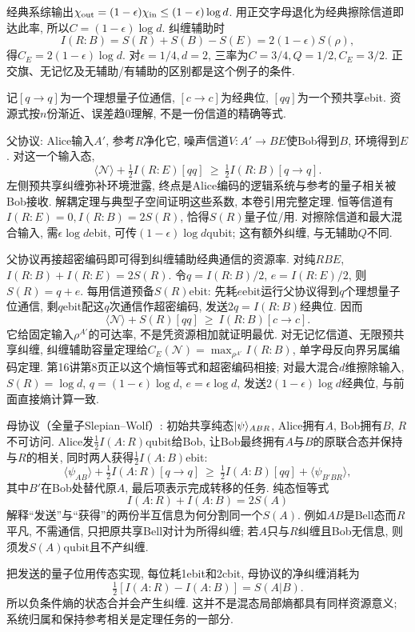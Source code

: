 经典系综输出$\chi_{\rm out}=(1-\epsilon)\chi_{\rm in}\le(1-\epsilon)\log d$. 用正交字母退化为经典擦除信道即达此率, 所以$C=(1-\epsilon)\log d$. 纠缠辅助时
\[I(R:B)=S(R)+S(B)-S(E)=2(1-\epsilon)S(\rho),\]
得$C_E=2(1-\epsilon)\log d$. 对$\epsilon=1/4,d=2$, 三率为$C=3/4,Q=1/2,C_E=3/2$. 正交旗、无记忆及无辅助/有辅助的区别都是这个例子的条件.

记$[q\to q]$为一个理想量子位通信, $[c\to c]$为经典位, $[qq]$为一个预共享ebit. 资源式按$n$份渐近、误差趋0理解, 不是一份信道的精确等式.

父协议: Alice输入$A'$, 参考$R$净化它, 噪声信道$V:A'\to BE$使Bob得到$B$, 环境得到$E$. 对这一个输入态,
\[\langle\mathcal N\rangle+\tfrac12I(R:E)[qq]
 \ \ge\ \tfrac12I(R:B)[q\to q].\]
左侧预共享纠缠弥补环境泄露, 终点是Alice编码的逻辑系统与参考的量子相关被Bob接收. 解耦定理与典型子空间证明这些系数, 本卷引用完整定理. 恒等信道有$I(R:E)=0,I(R:B)=2S(R)$, 恰得$S(R)$量子位/用. 对擦除信道和最大混合输入, 需$\epsilon\log d$ebit, 可传$(1-\epsilon)\log d$qubit; 这有额外纠缠, 与无辅助$Q$不同.

父协议再接超密编码即可得到纠缠辅助经典通信的资源率. 对纯$RBE$, $I(R:B)+I(R:E)=2S(R)$. 令$q=I(R:B)/2$, $e=I(R:E)/2$, 则$S(R)=q+e$. 每用信道预备$S(R)$ebit: 先耗$e$ebit运行父协议得到$q$个理想量子位通信, 剩$q$ebit配这$q$次通信作超密编码, 发送$2q=I(R:B)$经典位. 因而
\[\langle\mathcal N\rangle+S(R)[qq]
 \ \ge\ I(R:B)[c\to c].\]
它给固定输入$\rho^{A'}$的可达率, 不是凭资源相加就证明最优. 对无记忆信道、无限预共享纠缠, 纠缠辅助容量定理给$C_E(\mathcal N)=\max_{\rho^{A'}}I(R:B)$, 单字母反向界另属编码定理. 第16讲第8页正以这个熵恒等式和超密编码相接; 对最大混合$d$维擦除输入, $S(R)=\log d$, $q=(1-\epsilon)\log d$, $e=\epsilon\log d$, 发送$2(1-\epsilon)\log d$经典位, 与前面直接熵计算一致.

母协议（全量子Slepian--Wolf）: 初始共享纯态$\lvert \psi\rangle_{ABR}$, Alice拥有$A$, Bob拥有$B$, $R$不可访问. Alice发$\frac12I(A:R)$qubit给Bob, 让Bob最终拥有$A$与$B$的原联合态并保持与$R$的相关, 同时两人获得$\frac12I(A:B)$ebit:
\[\langle\psi_{AB}\rangle+\tfrac12I(A:R)[q\to q]
 \ \ge\ \tfrac12I(A:B)[qq]+\langle\psi_{B'BR}\rangle,\]
其中$B'$在Bob处替代原$A$, 最后项表示完成转移的任务. 纯态恒等式
\[I(A:R)+I(A:B)=2S(A)\]
解释“发送”与“获得”的两份半互信息为何分割同一个$S(A)$. 例如$AB$是Bell态而$R$平凡, 不需通信, 只把原共享Bell对计为所得纠缠; 若$A$只与$R$纠缠且Bob无信息, 则须发$S(A)$qubit且不产纠缠.

把发送的量子位用传态实现, 每位耗1ebit和2cbit, 母协议的净纠缠消耗为
\[\tfrac12[I(A:R)-I(A:B)]=S(A|B).\]
所以负条件熵的状态合并会产生纠缠. 这并不是混态局部熵都具有同样资源意义; 系统归属和保持参考相关是定理任务的一部分.


